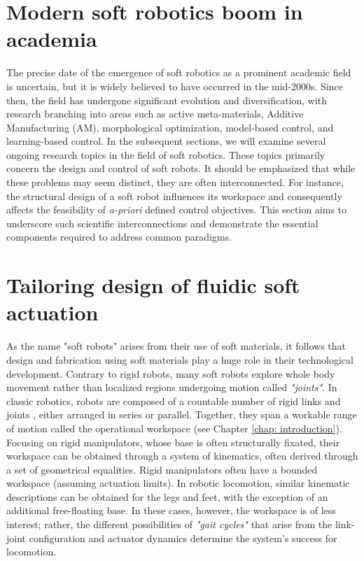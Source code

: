 \section{Modern soft robotics boom in academia}
The precise date of the emergence of soft robotics as a prominent academic field is uncertain, but it is widely believed to have occurred in the mid-2000s. Since then, the field has undergone significant evolution and diversification, with research branching into areas such as active meta-materials, Additive Manufacturing (AM), morphological optimization, model-based control, and learning-based control. In the subsequent sections, we will examine several ongoing research topics in the field of soft robotics. These topics primarily concern the design and control of soft robots. It should be emphasized that while these problems may seem distinct, they are often interconnected. For instance, the structural design of a soft robot influences its workspace and consequently affects the feasibility of \textit{a-priori} defined control objectives. This section aims to underscore such scientific interconnections and demonstrate the essential components required to address common paradigms.

\section{Tailoring design of fluidic soft actuation}
\label{sec:C2:conventional_actuation}
As the name "soft robots" arises from their use of soft materials, it follows that design and fabrication using soft materials play a huge role in their technological development. Contrary to rigid robots, many soft robots explore whole body movement rather than localized regions undergoing motion called \textit{"joints"}. In classic robotics, robots are composed of a countable number of rigid links and joints \cite{Spong2006, Murray1994, Corke2011}, either arranged in series or parallel. Together, they span a workable range of motion called the operational workspace \cite{Spong2006} (see Chapter \ref{chap: introduction}). Focusing on rigid manipulators, whose base is often structurally fixated, their workspace can be obtained through a system of kinematics, often derived through a set of geometrical equalities. Rigid manipulators often have a bounded workspace (assuming actuation limits). In robotic locomotion, similar kinematic descriptions can be obtained for the legs and feet, with the exception of an additional free-floating base. In these cases, however, the workspace is of less interest; rather, the different possibilities of \textit{"gait cycles"} that arise from the link-joint configuration and actuator dynamics determine the system's success for locomotion.

